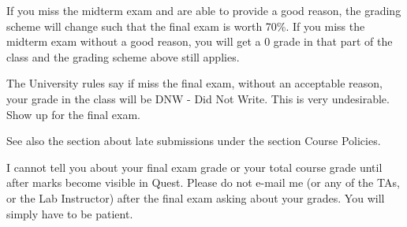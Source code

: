 \documentclass[letterpaper,10pt]{article}
\begin{document}
If you miss the midterm exam and are able to provide a good reason, the grading scheme will change such that the final exam is worth 70\%. If you miss the midterm exam without a good reason, you will get a 0 grade in that part of the class and the grading scheme above still applies.

The University rules say if miss the final exam, without an acceptable reason, your grade in the class will be DNW - Did Not Write. This is very undesirable. Show up for the final exam.

See also the section about late submissions under the section Course Policies.

I cannot tell you about your final exam grade or your total course grade until after marks become visible in Quest. Please do not e-mail me (or any of the TAs, or the Lab Instructor) after the final exam asking about your grades. You will simply have to be patient.



%
\end{document}
